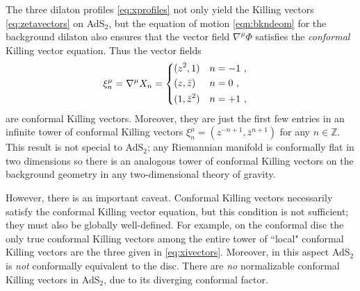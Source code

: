 \documentclass[12pt]{article}
\begin{document}
The three dilaton profiles \eqref{eq:xprofiles} not only yield the Killing vectors \eqref{eq:zetavectors} on AdS$_2$, but the 
equation of motion \eqref{eqn:bkndeom} for the background dilaton also ensures that the 
vector field $\nabla^\mu\Phi$ satisfies the {\it conformal} Killing vector equation. Thus the vector fields
\begin{equation}\begin{aligned}
	\xi_n^\mu &= \nabla^\mu X_n =\begin{dcases} 
		(z^2,1) & n = -1~, \\
		(z,\bar{z}) & n = 0~,\\
		(1,{\bar z}^2) & n = +1~, 
	\end{dcases}
\label{eq:xivectors}
\end{aligned}\end{equation}
are conformal Killing vectors. Moreover, they are just the first few entries in an infinite tower of conformal Killing vectors $\xi^\mu_n = (z^{-n+1},{\bar z}^{n+1})$ for any $n \in \mathbb{Z}$.  
This result is not special to AdS$_2$; any Riemannian manifold is conformally flat in two dimensions so there is an analogous tower of conformal Killing vectors on the background geometry in any two-dimensional theory of gravity.  

However, there is an important caveat. Conformal Killing vectors necessarily satisfy the conformal Killing vector equation, but this condition is not sufficient;
they must also be globally well-defined. For example, on the conformal disc the only true conformal Killing vectors among the entire tower of ``local" conformal Killing vectors 
are the three given in \eqref{eq:xivectors}. Moreover, in this aspect AdS$_2$ is {\it not} conformally equivalent to the disc. There are {\it no} normalizable conformal Killing vectors in AdS$_2$, due to its diverging conformal factor. 
\end{document}
